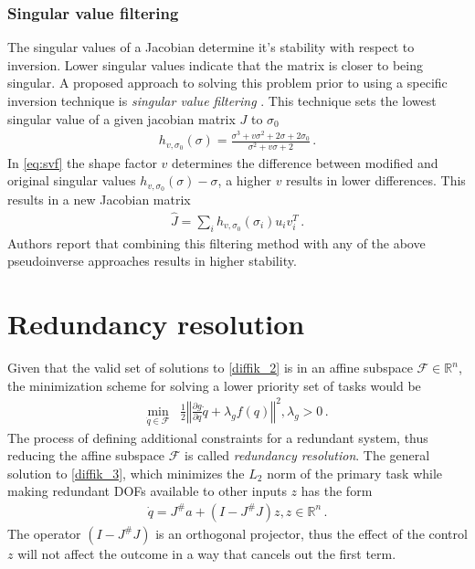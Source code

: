 \documentclass[times, utf8, diplomski, english]{fer}
\begin{document}
\subsubsection{Singular value filtering}
The singular values of a Jacobian determine it's stability with respect to inversion.
Lower singular values indicate that the matrix is closer to being singular.
A proposed approach to solving this problem prior to using a specific inversion technique is \textit{singular value filtering} \citep{colome2012redundant}. 
This technique sets the lowest singular value of a given jacobian matrix $J$ to $\sigma_0$
\begin{align}\label{eq:svf}
h_{v,\sigma_0}\left(\sigma\right) = \frac{\sigma^3 + v\sigma^2 + 2\sigma + 2\sigma_0}{\sigma^2 + v\sigma + 2}\,.
\end{align}
In \eqref{eq:svf} the shape factor $v$ determines the difference between modified and original singular values $h_{v,\sigma_0}(\sigma)-\sigma$, a higher $v$ results in lower differences. 
This results in a new Jacobian matrix
\begin{align} \label{eq:svf jacobian}
\hat{J}= \sum\limits_{i}{h_{v,\sigma_0}(\sigma_i)u_iv_i^T}\, .
\end{align}
Authors report that combining this filtering method with any of the above pseudoinverse approaches results in higher stability.
\section{Redundancy resolution}\label{section:redundancy resolution}
Given that the valid set of solutions to \ref{diffik_2} is in an affine subspace $\mathcal{F} \in \mathbb{R}^n$, the minimization scheme for solving a lower priority set of tasks would be
\begin{align}
\label{diffik_3}
\min\limits_{\dot{q} \in \mathcal{F}} & \frac{1}{2}\left\Vert\frac{\partial g}{\partial q} \dot{q} + \lambda_{g}f\left(q\right)\right\Vert^2 , \lambda_{g} > 0\, .
\end{align}
The process of defining additional constraints for a redundant system, thus reducing the affine subspace $\mathcal{F}$ is called \textit{redundancy resolution}.
The general solution to \eqref{diffik_3}, which minimizes the $L_2$ norm of the primary task while making redundant DOFs available to other inputs $z$ has the form
\begin{align}
\label{rresolution_0}
\dot{q} = J^{\#}a + \left(I - J^{\#}J\right)z ,  z \in \mathbb{R}^n\, .
\end{align}
The operator $\left(I - J^{\#}J\right)$ is an orthogonal projector, thus the effect of the control $z$ will not affect the outcome in a way that cancels out the first term. 
\end{document}
